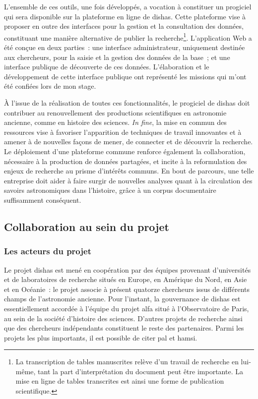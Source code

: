 \documentclass[a4paper,12pt,twoside]{book}
\newcommand{\eng}{\emph}
\newcommand{\dishas}{\gls{dishas}\xspace}
\newcommand{\alfa}{\gls{alfa}\xspace}
\newcommand{\hamsi}{\gls{hamsi}\xspace}
\newcommand{\pal}{\gls{pal}\xspace}
\begin{document}
L'ensemble de ces outils, une fois développés, a vocation à constituer un progiciel qui sera disponible sur la plateforme en ligne de \dishas. Cette plateforme vise à proposer en outre des interfaces pour la gestion et la consultation des données, constituant une manière alternative de publier la recherche\footnote{La transcription de tables manuscrites relève d'un travail de recherche en lui-même, tant la part d'interprétation du document peut être importante. La mise en ligne de tables transcrites est ainsi une forme de publication scientifique.}. L'application Web a été conçue en deux parties~: une interface administrateur, uniquement destinée aux chercheurs, pour la saisie et la gestion des données de la base~; et une interface publique de découverte de ces données. L'élaboration et le développement de cette interface publique ont représenté les missions qui m'ont été confiées lors de mon stage.

À l'issue de la réalisation de toutes ces fonctionnalités, le progiciel de \dishas doit contribuer au renouvellement des productions scientifiques en astronomie ancienne, comme en histoire des sciences. \eng{In fine}, la mise en commun des ressources vise à favoriser l'apparition de techniques de travail innovantes et à amener à de nouvelles façons de mener, de connecter et de découvrir la recherche. Le déploiement d'une plateforme commune renforce également la collaboration, nécessaire à la production de données partagées, et incite à la reformulation des enjeux de recherche au prisme d'intérêts communs. En bout de parcours, une telle entreprise doit aider à faire surgir de nouvelles analyses quant à la circulation des savoirs astronomiques dans l'histoire, grâce à un corpus documentaire suffisamment conséquent.

		\subsection{Collaboration au sein du projet}
			\subsubsection{Les acteurs du projet}
Le projet \dishas est mené en coopération par des équipes provenant d'universités et de laboratoires de recherche situés en Europe, en Amérique du Nord, en Asie et en Océanie~: le projet associe à présent quatorze chercheurs issus de différents champs de l'astronomie ancienne. Pour l'instant, la gouvernance de \dishas est essentiellement accordée à l'équipe du projet \alfa situé à l'Observatoire de Paris, au sein de la société d'histoire des sciences. D'autres projets de recherche ainsi que des chercheurs indépendants constituent le reste des partenaires. Parmi les projets les plus importants, il est possible de citer \pal et \hamsi.
\end{document}

